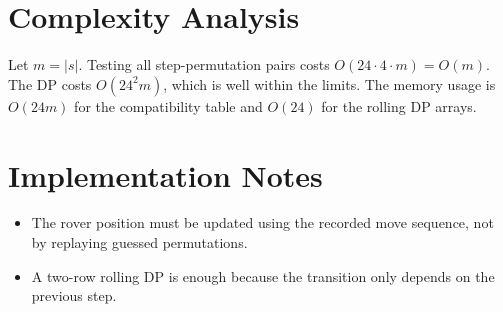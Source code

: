 \documentclass[11pt]{article}
\begin{document}
\section*{Complexity Analysis}

Let $m=|s|$. Testing all step-permutation pairs costs $O(24 \cdot 4 \cdot m)=O(m)$. The DP costs
$O(24^2 m)$, which is well within the limits. The memory usage is $O(24m)$ for the compatibility table
and $O(24)$ for the rolling DP arrays.

\section*{Implementation Notes}

\begin{itemize}[leftmargin=*]
    \item The rover position must be updated using the recorded move sequence, not by replaying guessed
    permutations.
    \item A two-row rolling DP is enough because the transition only depends on the previous step.
\end{itemize}
\end{document}
